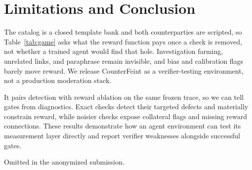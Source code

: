 \documentclass{article}
\begin{document}
\section{Limitations and Conclusion}
\label{sec:limits}

The catalog is a closed template bank and both counterparties are scripted, so Table~\ref{tab:game} asks what the reward function pays once a check is removed, not whether a trained agent would find that hole. Investigation farming, unrelated links, and paraphrase remain invisible, and bias and calibration flags barely move reward. We release CounterFeint as a verifier-testing environment, not a production moderation stack.

It pairs detection with reward ablation on the same frozen trace, so we can tell gates from diagnostics. Exact checks detect their targeted defects and materially constrain reward, while noisier checks expose collateral flags and missing reward connections. These results demonstrate how an agent environment can test its measurement layer directly and report verifier weaknesses alongside successful gates.

\begin{ack}
Omitted in the anonymized submission.
\end{ack}
\end{document}
